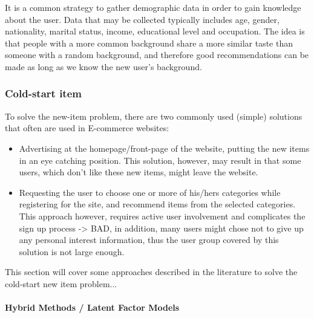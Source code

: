 It is a common strategy to gather demographic data in order to gain knowledge about the user. Data that may be collected typically includes age, gender, nationality, marital status, income, educational level and occupation. The idea is that people with a more common background share a more similar taste than someone with a random background, and therefore good recommendations can be made as long as we know the new user’s background.


\subsubsection{Cold-start item}

To solve the new-item problem, there are two commonly used (simple) solutions that often are used in E-commerce websites:

\begin{itemize}
\item Advertising at the homepage/front-page of the website, putting the new items in an eye catching position. This solution, however, may 		result in that some users, which don't like these new items, might leave the website.
\item Requesting the user to choose one or more of his/hers categories while registering for the site, and recommend items from the selected categories. This approach however, requires active user involvement and complicates the sign up process -> BAD, in addition, many users might chose not to give up any personal interest information, thus the user group covered by this solution is not large enough.
\end{itemize}

This section will cover some approaches described in the literature to solve the cold-start new item problem...


\paragraph{Hybrid Methods / Latent Factor Models}


